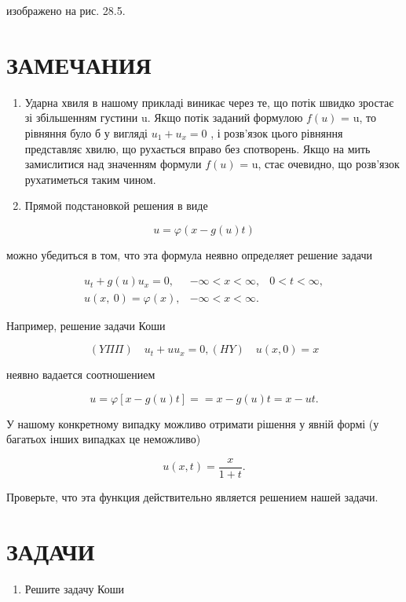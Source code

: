 \documentclass[
  ukrainian,
]{article}
\providecommand{\tightlist}{%
  \setlength{\itemsep}{0pt}\setlength{\parskip}{0pt}}
\begin{document}
изображено на рис. 28.5.

\section{ЗАМЕЧАНИЯ}\label{ux437ux430ux43cux435ux447ux430ux43dux438ux44f-11}

\begin{enumerate}
\def\labelenumi{\arabic{enumi}.}
\item
  Ударна хвиля в нашому прикладі виникає через те, що потік швидко
  зростає зі збільшенням густини u. Якщо потік заданий формулою \(f(u)\)
  = u, то рівняння було б у вигляді \(u_1+u_x=0\) , і розв'язок цього
  рівняння представляє хвилю, що рухається вправо без спотворень. Якщо
  на мить замислитися над значенням формули \(f(u)\) = u, стає очевидно,
  що розв'язок рухатиметься таким чином.
\item
  Прямой подстановкой решения в виде
\end{enumerate}

\[
u = \varphi(x - g(u) t)
\]

можно убедиться в том, что эта формула неявно определяет решение задачи

\[
\begin{aligned} u_t + g\left(u\right) u_x = 0, & -\infty < x < \infty, & 0 < t < \infty, \\ u\left(x, \ 0\right) = \varphi\left(x\right), & -\infty < x < \infty. \end{aligned}
\]

Например, решение задачи Коши

\[
(Y\Pi\Pi) \quad u_t + uu_x = 0,
(HY) \quad u(x, 0) = x
\]

неявно вадается соотношением

\[
u = \varphi [x - g(u) t] =
= x - g(u) t = x - ut.
\]

У нашому конкретному випадку можливо отримати рішення у явній формі (у
багатьох інших випадках це неможливо)

\[
u(x, t) = \frac{x}{1+t}.
\]

Проверьте, что эта функция действительно является решением нашей задачи.

\section{\texorpdfstring{\textbf{ЗАДАЧИ}}{ЗАДАЧИ}}\label{ux437ux430ux434ux430ux447ux438-12}

\begin{enumerate}
\def\labelenumi{\arabic{enumi}.}
\tightlist
\item
  Решите задачу Коши
\end{enumerate}
\end{document}
